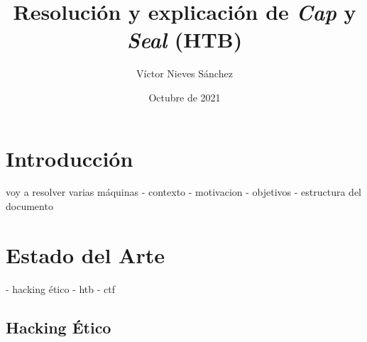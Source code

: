 \documentclass[a4paper, 12pt]{article} %
\author{Víctor Nieves Sánchez}
\date{Octubre de 2021}
\title{Resolución y explicación de \textit{Cap} y \textit{Seal} (\acrshort{HTB})}
\begin{document}
\maketitle
\null
\newpage
\begin{otherlanguage}{spanish}



    \newpage
    \tableofcontents

    \newpage
    \listoffigures

    \newpage
    \renewcommand{\listtablename}{Lista de Tablas}
    \listoftables

    \newpage
    \lstlistoflistings

    \newpage
    \printglossary[type=\acronymtype]

    \newpage
    \begin{abstract}
        \normalsize
        
    \end{abstract}

    \newpage
    \renewcommand{\spanishabstractname}{Abstract}
    \begin{abstract}
        \normalsize
        
    \end{abstract}
    \newpage

    \section{Introducción}
    voy a resolver varias máquinas
    - contexto
    - motivacion
    - objetivos
    - estructura del documento

    \newpage
    \section{Estado del Arte}
    - hacking ético
    - htb
    - ctf
    \subsection{Hacking Ético}
    


\end{otherlanguage}
\end{document}
